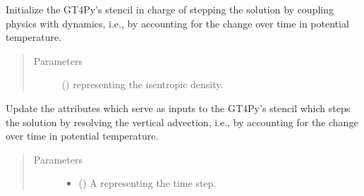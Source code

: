 \documentclass[letterpaper,10pt,english]{sphinxmanual}
\begin{document}
\begin{fulllineitems}
\begin{fulllineitems}
\begin{quote}
\begin{description}
\end{description}\end{quote}

\end{fulllineitems}


\begin{fulllineitems}
\label{\detokenize{api:dycore.prognostic_isentropic.PrognosticIsentropic._stencil_stepping_by_coupling_physics_with_dynamics_initialize}}
Initialize the GT4Py’s stencil in charge of stepping the solution by coupling physics with dynamics,
i.e., by accounting for the change over time in potential temperature.
\begin{quote}\begin{description}
\item[{Parameters}] \leavevmode
{} () \textendash{}  representing the isentropic density.

\end{description}\end{quote}

\end{fulllineitems}


\begin{fulllineitems}
\label{\detokenize{api:dycore.prognostic_isentropic.PrognosticIsentropic._stencil_stepping_by_coupling_physics_with_dynamics_set_inputs}}
Update the attributes which serve as inputs to the GT4Py’s stencil which steps the solution
by resolving the vertical advection, i.e., by accounting for the change over time in potential temperature.
\begin{quote}\begin{description}
\item[{Parameters}] \leavevmode\begin{itemize}
\item {} 
 () \textendash{} A  representing the time step.


\end{itemize}
\end{description}
\end{quote}
\end{fulllineitems}
\end{fulllineitems}
\end{document}
